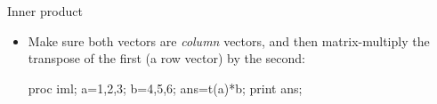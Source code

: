 \documentclass[unknownkeysallowed]{beamer}\usepackage[]{graphicx}\usepackage[]{color}
\begin{document}
\begin{frame}[fragile]{Inner product}
  
  \begin{itemize}
  \item Make sure both vectors are \emph{column} vectors, and then
    matrix-multiply the transpose of the first (a row vector) by the second:
    
    \begin{Sascode}[store=imi]
proc iml;
  a={1,2,3};
  b={4,5,6};
  ans=t(a)*b;
  print ans;
    \end{Sascode}
    
  \end{itemize}
  
\end{frame}

\end{document}
